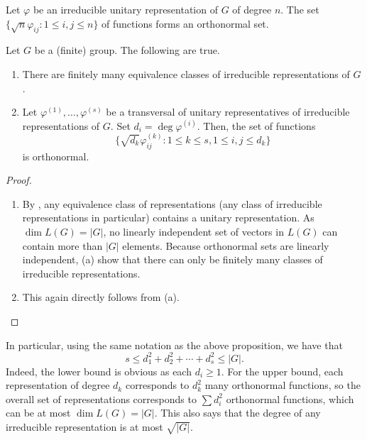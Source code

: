 		\begin{fcor}
			\label{cor: orthonormal set of fns for irred unitary rep}
			Let $\varphi$ be an irreducible unitary representation of $G$ of degree $n$. The set $\{ \sqrt{n} \varphi_{ij} : 1 \le i,j \le n \}$ of functions forms an orthonormal set.
		\end{fcor}

		\begin{fprop}
			\label{prop: finitely many irreducible representations}
			Let $G$ be a (finite) group. The following are true.
			\begin{enumerate}[label = (\alph*)]
				\item There are finitely many equivalence classes of irreducible representations of $G$.
				\item Let $\varphi^{(1)},\ldots,\varphi^{(s)}$ be a transversal of unitary representatives of irreducible representations of $G$. Set $d_i = \deg \varphi^{(i)}$. Then, the set of functions
				\[ \{ \sqrt{d_k} \varphi^{(k)}_{ij} : 1 \le k \le s, 1 \le i,j \le d_k \} \]
				is orthonormal.
			\end{enumerate}
		\end{fprop}
		\begin{proof}
			\phantom{pain}
			\begin{enumerate}[label = (\alph*)]
				\item By , any equivalence class of representations (any class of irreducible representations in particular) contains a unitary representation. As $\dim L(G) = |G|$, no linearly independent set of vectors in $L(G)$ can contain more than $|G|$ elements. Because orthonormal sets are linearly independent, (a) show that there can only be finitely many classes of irreducible representations.

				\item This again directly follows from (a).
			\end{enumerate}
		\end{proof}

		In particular, using the same notation as the above proposition, we have that
		\[ s \le d_1^2 + d_2^2 + \cdots + d_s^2 \le |G|. \]
		Indeed, the lower bound is obvious as each $d_i \ge 1$. For the upper bound, each representation of degree $d_k$ corresponds to $d_k^2$ many orthonormal functions, so the overall set of representations corresponds to $\sum d_i^2$ orthonormal functions, which can be at most $\dim L(G) = |G|$. This also says that the degree of any irreducible representation is at most $\sqrt{|G|}$.

